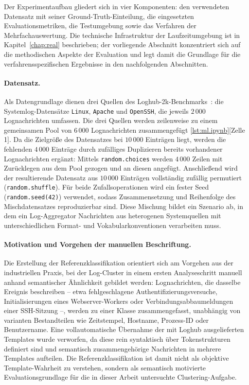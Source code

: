 Der Experimentaufbau gliedert sich in vier Komponenten: den verwendeten Datensatz mit seiner
Ground-Truth-Einteilung, die eingesetzten Evaluationsmetriken, die Testumgebung sowie das
Verfahren der Mehrfachauswertung. Die technische Infrastruktur der Laufzeitumgebung ist in
Kapitel~\ref{chap:real} beschrieben; der vorliegende Abschnitt konzentriert sich auf die
methodischen Aspekte der Evaluation und legt damit die Grundlage für die verfahrensspezifischen
Ergebnisse in den nachfolgenden Abschnitten.

\paragraph{Datensatz.}
Als Datengrundlage dienen drei Quellen des Loghub-2k-Benchmarks~\cite{zhu2023loghublargecollectionlog}: die
Systemlog-Datensätze \texttt{Linux}, \texttt{Apache} und \texttt{OpenSSH}, die jeweils
$2\,000$ Lognachrichten umfassen. Die drei Quellen werden zeilenweise zu einem gemeinsamen
Pool von $6\,000$ Lognachrichten zusammengefügt \ref{lst:ml.ipynb}[Zelle 1]. Da die Zielgröße des Datensatzes bei $10\,000$ Einträgen liegt, werden die
fehlenden $4\,000$ Einträge durch zufälliges Duplizieren bereits vorhandener Lognachrichten
ergänzt: Mittels \texttt{random.choices} werden $4\,000$ Zeilen mit Zurücklegen aus dem Pool
gezogen und an diesen angefügt. Anschließend wird der resultierende Datensatz aus
$10\,000$ Einträgen vollständig zufällig permutiert (\texttt{random.shuffle}). Für beide
Zufallsoperationen wird ein fester Seed (\texttt{random.seed(42)}) verwendet, sodass
Zusammensetzung und Reihenfolge des Mischdatensatzes reproduzierbar sind. Diese Mischung
bildet ein Szenario ab, in dem ein Log-Aggregator Nachrichten aus
heterogenen Systemquellen mit unterschiedlichen Format- und Vokabularkonventionen
verarbeiten muss.

\paragraph{Motivation und Vorgehen der manuellen Beschriftung.}
Die Erstellung der Referenzklassifikation orientiert sich am Vorgehen aus
der industriellen Praxis, bei der Log-Cluster in einem ersten Analyseschritt
manuell anhand semantischer Ähnlichkeit gebildet werden: Lognachrichten,
die dasselbe Ereignis beschreiben -- etwa fehlgeschlagene
Authentifizierungsversuche, Initialisierungen eines Webserver-Workers oder
Verbindungsabbau\-meldungen einer SSH-Sitzung --, werden zu einer Klasse
zusammengefasst, unabhängig von varianten Bestandteilen wie Zeitstempel,
Hostname, Prozess-ID oder Benutzername. 
Eine vollautomatische Übernahme der
mit Loghub ausgelieferten Templates wurde verworfen, da diese rein
syntaktisch über Tokenstrukturen definiert sind und semantisch
zusammen\-gehörige Nachrichten in mehrere Templates aufteilen.
Die Referenzklassifikation ist damit
nicht als objektive Template-Wahrheit zu verstehen, sondern als semantisch
motivierte Evaluationsgrundlage für die in dieser Arbeit untersuchte Clustering-Aufgabe.

